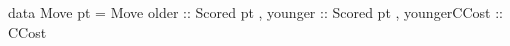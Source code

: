 data Move pt = Move { older        :: Scored pt
                    , younger      :: Scored pt
                    , youngerCCost :: CCost }
